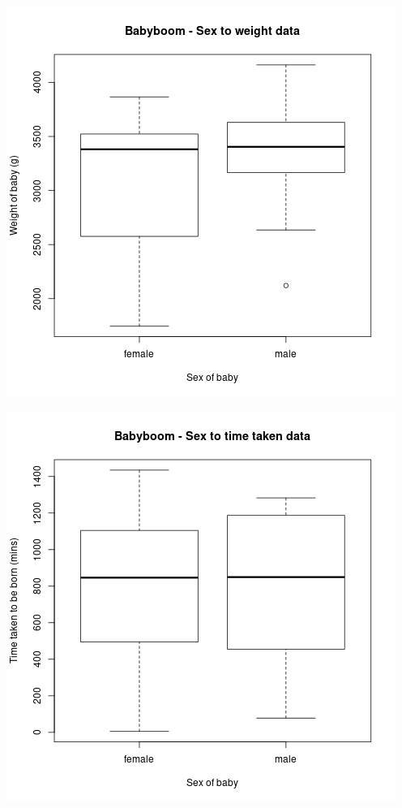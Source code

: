 \documentclass[11pt]{article}
\begin{document}
\begin{center}
\includegraphics[width=.9\linewidth]{bb_weight_sex.png}
\end{center}

\begin{center}
\includegraphics[width=.9\linewidth]{bb_minutes_sex.png}
\end{center}
\end{document}
